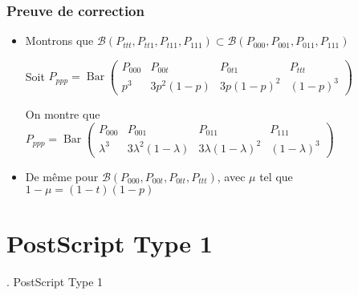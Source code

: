 \documentclass[french]{beamer}
\DeclareMathOperator{\bary}{Bar}
\begin{document}
\begin{frame}
  \frametitle{Preuve de correction}

  {\small
    \begin{itemize}
      
    \item
      Montrons que $\mathcal{B}(P_{ttt},P_{tt1},P_{t11},P_{111}) \subset \mathcal{B}(P_{000},P_{001},P_{011},P_{111})$

      \medskip

      Soit \quad $P_{ppp} = \bary \begin{pmatrix} P_{000} & P_{00t} & P_{0t1} & P_{ttt} \\ p^3 & 3p^2(1-p) & 3p(1-p)^2 & (1-p)^3\end{pmatrix}$
        
        \medskip
      
        On montre que \quad $P_{ppp} = \bary \begin{pmatrix} P_{000} & P_{001} & P_{011} & P_{111} \\ \lambda^3 & 3\lambda^2(1-\lambda) & 3\lambda(1-\lambda)^2 & (1-\lambda)^3\end{pmatrix}$ 

        \item
          De même pour $\mathcal{B}(P_{000},P_{00t},P_{0tt},P_{ttt})$, avec $\mu$ tel que $1-\mu = (1-t)(1-p)$
          
    \end{itemize}
  }
  
\end{frame}

\section{PostScript Type 1}

\begin{frame}
  \center \LARGE \thesection. PostScript Type 1
\end{frame}
\end{document}
